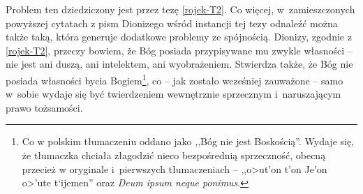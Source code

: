 Problem ten dziedziczony jest przez tezę \eqref{rojek-T2}. Co więcej,
w~zamieszczonych powyższej cytatach z pism Dionizego  wśród
instancji tej tezy
odnaleźć można także taką, która generuje dodatkowe problemy ze spójnością. Dionizy, zgodnie z \eqref{rojek-T2}, przeczy bowiem, że Bóg posiada
przypisywane mu zwykle własności -- nie jest ani duszą, ani intelektem,
ani wyobrażeniem. Stwierdza także, że Bóg nie posiada własności bycia
Bogiem\footnote{Co w polskim tłumaczeniu oddano jako ,,Bóg nie jest \guillemotleft  Boskością\guillemotright ''. Wydaje się, że tłumaczka chciała złagodzić nieco bezpośrednią sprzeczność, obecną przecież w oryginale i~pierwszych tłumaczeniach -- ,,\textgreek{o>ut'on t'on Je'on o>'ute t`ijemen}'' oraz \textit{Deum ipsum neque ponimus}.}, co -- jak zostało wcześniej zauważone --
samo w~sobie wydaje się być twierdzeniem wewnętrznie sprzecznym i~naruszającym prawo tożsamości.







